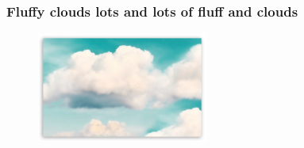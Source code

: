 \begin{frame}[fragile]
\frametitle{Fluffy clouds lots and lots of fluff and clouds}
\begin{figure}
\includegraphics[width=0.5\textwidth,natwidth=510,natheight=330]{image/fluffy-clouds.jpg}
\end{figure}
\end{frame}
